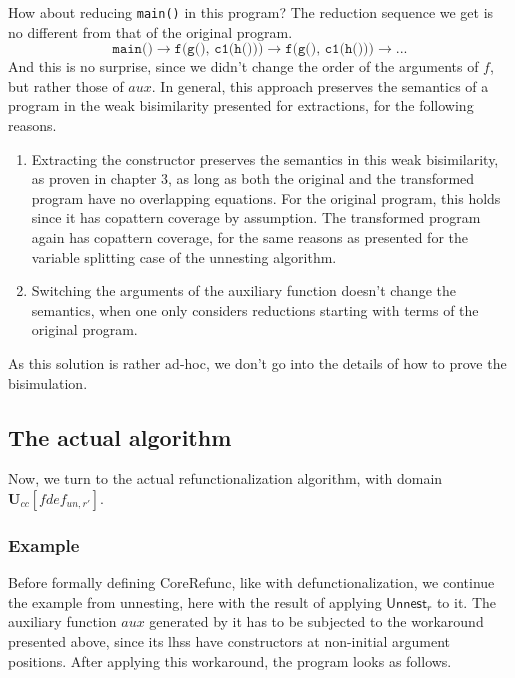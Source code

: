 How about reducing \texttt{main()} in this program? The reduction sequence we get is no different from that of the original program.
\[
\texttt{main()} \longrightarrow \texttt{f(g(), c1(h()))} \longrightarrow \texttt{f(g(), c1(h()))} \longrightarrow ...
\]
And this is no surprise, since we didn't change the order of the arguments of $f$, but rather those of $aux$. In general, this approach preserves the semantics of a program in the weak bisimilarity presented for extractions, for the following reasons.
\begin{enumerate}
\item Extracting the constructor preserves the semantics in this weak bisimilarity, as proven in chapter 3, as long as both the original and the transformed program have no overlapping equations. For the original program, this holds since it has copattern coverage by assumption. The transformed program again has copattern coverage, for the same reasons as presented for the variable splitting case of the unnesting algorithm.

\item Switching the arguments of the auxiliary function doesn't change the semantics, when one only considers reductions starting with terms of the original program.
\end{enumerate}
As this solution is rather ad-hoc, we don't go into the details of how to prove the bisimulation.

\subsection{The actual algorithm}

Now, we turn to the actual refunctionalization algorithm, with domain $\mathbf{U}_{cc}[fdef_{un,r'}]$.

\subsubsection{Example}

Before formally defining \textsf{CoreRefunc}, like with defunctionalization, we continue the example from unnesting, here with the result of applying $\textsf{Unnest}_r$ to it. The auxiliary function $aux$ generated by it has to be subjected to the workaround presented above, since its lhss have constructors at non-initial argument positions. After applying this workaround, the program looks as follows.

